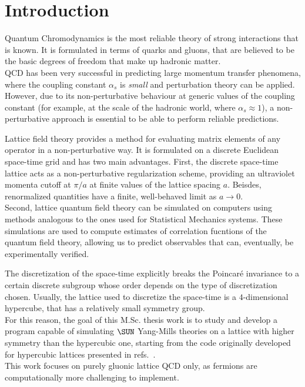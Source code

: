 \pagestyle{myFancy}
\chapter{Introduction}

Quantum Chromodynamics is the most reliable theory of strong interactions that is known.
It is formulated in terms of quarks and gluons, that are believed to be the basic degrees of freedom that make up hadronic matter.\\
QCD has been very successful in predicting large momentum transfer phenomena, where the coupling constant $\alpha_s$ is \emph{small} and perturbation theory can be applied.
However, due to its non-perturbative behaviour at generic values of the coupling constant (for example, at the scale of the hadronic world, where $\alpha_s\approx1$), a non-perturbative approach is essential to be able to perform reliable predictions.

Lattice field theory provides a method for evaluating matrix elements of any operator in a non-perturbative way.
It is formulated on a discrete Euclidean space-time grid and has two main advantages.
First, the discrete space-time lattice acts as a non-perturbative regularization scheme, providing an ultraviolet momenta cutoff at $\pi/a$ at finite values of the lattice spacing $a$.
Beisdes, renormalized quantities have a finite, well-behaved limit as $a\to0$.\\
Second, lattice quantum field theory can be simulated on computers using methods analogous to the ones used for Statistical Mechanics systems.
These simulations are used to compute estimates of correlation fucntions of the quantum field theory, allowing us to predict observables that can, eventually, be experimentally verified.

The discretization of the space-time explicitly breaks the Poincaré invariance to a certain discrete subgroup whose order depends on the type of discretization chosen.
Usually, the lattice used to discretize the space-time is a $4$-dimensional hypercube, that has a relatively small symmetry group.\\
For this reason, the goal of this M.Sc. thesis work is to study and develop a program capable of simulating $\SUN$ Yang-Mills theories on a lattice with higher symmetry than the hypercubic one, starting from the code originally developed for hypercubic lattices presented in refs.~\cite{Panero:2009tv,Mykkanen:2012ri}.\\
This work focuses on purely gluonic lattice QCD only, as fermions are computationally more challenging to implement.

